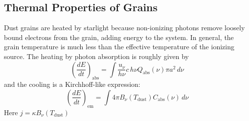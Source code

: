 \documentclass[10pt]{article}
\numberwithin{equation}{section}
\begin{document}
\subsection{Thermal Properties of Grains} %
\label{sub:thermal_properties_of_grains}
Dust grains are heated by starlight because non-ionizing photons remove loosely bound electrons from the grain, adding energy to the system. In general, the grain temperature is much less than the effective temperature of the ionizing source. The heating by photon absorption is roughly given by
\begin{equation}
  \label{eq:dust:9} \left(\frac{dE}{dt}\right)_{\mathrm{abs}} = \int \frac{u_\nu}{h\nu} c\,h\nu Q_{\mathrm{abs}}(\nu)\pi a^2\,d\nu
\end{equation}
and the cooling is a Kirchhoff-like expression:
\begin{equation}
  \label{eq:dust:10} \left(\frac{dE}{dt}\right)_{\mathrm{em}} = \int 4\pi B_\nu(T_{\mathrm{dust}})C_{\mathrm{abs}}(\nu)\,d\nu
\end{equation}
Here $j=\kappa B_\nu(T_{\mathrm{dust}})$
\end{document}
